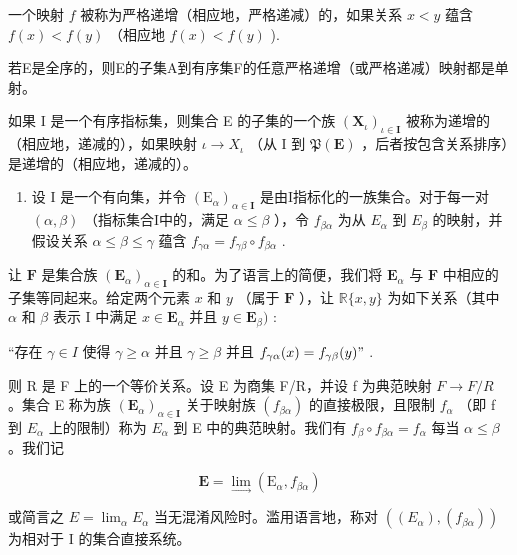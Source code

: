 一个映射 \(f\) 被称为严格递增（相应地，严格递减）的，如果关系 \(x < y\) 蕴含 \(f(x) < f(y)\) （相应地 \(f(x) < f(y)\) ).

若E是全序的，则E的子集A到有序集F的任意严格递增（或严格递减）映射都是单射。

如果 I 是一个有序指标集，则集合 E 的子集的一个族 \((\mathbf{X}_{\iota})_{\iota\in\mathbf{I}}\) 被称为递增的（相应地，递减的），如果映射 \(\iota\to X_{\iota}\) （从 I 到 \(\mathfrak{P}(\mathbf{E})\) ，后者按包含关系排序）是递增的（相应地，递减的）。

\begin{enumerate}
\def\labelenumi{\arabic{enumi}.}
\setcounter{enumi}{12}
\tightlist
\item
  设 I 是一个有向集，并令 \((\mathrm{E}_{\alpha})_{\alpha\in\mathbf{I}}\) 是由I指标化的一族集合。对于每一对 \((\alpha,\beta)\) （指标集合I中的，满足 \(\alpha\leqslant\beta\) ），令 \(f_{\beta\alpha}\) 为从 \(E_{\alpha}\) 到 \(E_{\beta}\) 的映射，并假设关系 \(\alpha\leqslant\beta\leqslant\gamma\) 蕴含 \(f_{\gamma\alpha}=f_{\gamma\beta}\circ f_{\beta\alpha}\) .
\end{enumerate}

让 \(\mathbf{F}\) 是集合族 \((\mathbf{E}_{\alpha})_{\alpha \in \mathbf{I}}\) 的和。为了语言上的简便，我们将 \(\mathbf{E}_{\alpha}\) 与 \(\mathbf{F}\) 中相应的子集等同起来。给定两个元素 \(x\) 和 \(y\) （属于 \(\mathbf{F}\) ），让 \(\mathbb{R}\{x, y\}\) 为如下关系（其中 \(\alpha\) 和 \(\beta\) 表示 I 中满足 \(x \in \mathbf{E}_{\alpha}\) 并且 \(y \in \mathbf{E}_{\beta})\) :

“存在 \(\gamma \in I\) 使得 \(\gamma \geqslant \alpha\) 并且 \(\gamma \geqslant \beta\) 并且 \(f_{\gamma \alpha}(x) = f_{\gamma \beta}(y) "\) .

则 R 是 F 上的一个等价关系。设 E 为商集 F/R，并设 f 为典范映射 \(F \rightarrow F/R\) 。集合 E 称为族 \((\mathbf{E}_{\alpha})_{\alpha \in \mathbf{I}}\) 关于映射族 \((f_{\beta\alpha})\) 的直接极限，且限制 \(f_{\alpha}\) （即 f 到 \(E_{\alpha}\) 上的限制）称为 \(E_{\alpha}\) 到 E 中的典范映射。我们有 \(f_{\beta} \circ f_{\beta\alpha} = f_{\alpha}\) 每当 \(\alpha \leqslant \beta\) 。我们记

\[
\mathbf {E} = \lim _ {\rightarrow} (\mathrm{E} _ {\alpha}, f _ {\beta \alpha})
\]

或简言之 \(E = \lim_{\alpha} E_{\alpha}\) 当无混淆风险时。滥用语言地，称对 \(((E_{\alpha}), (f_{\beta\alpha}))\) 为相对于 I 的集合直接系统。

